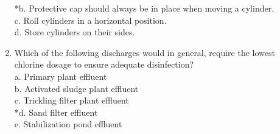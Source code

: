 \begin{enumerate}
*b. Protective cap should always be in place when moving a cylinder. \\
c. Roll cylinders in a horizontal position. \\
d. Store cylinders on their sides. \\
\item Which of the following discharges would in general, require the lowest chlorine dosage to ensure adequate disinfection? \\
a. Primary plant effluent \\
b. Activated sludge plant effluent \\
c. Trickling filter plant effluent \\
*d. Sand filter effluent \\
e. Stabilization pond effluent \\



\end{enumerate}


